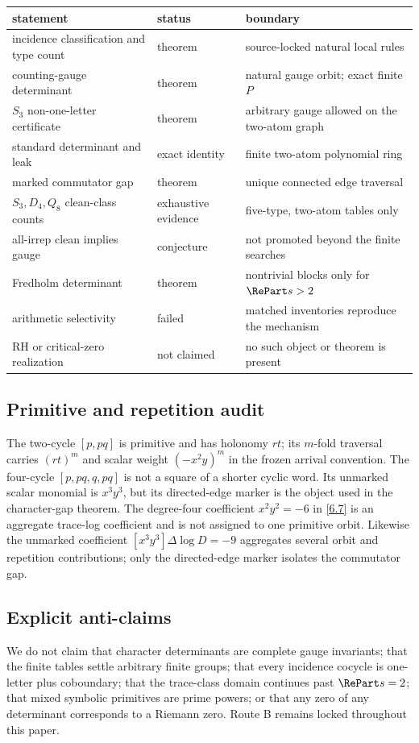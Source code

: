 \begin{tabularx}{\textwidth}{L{0.30\textwidth}L{0.18\textwidth}X}
\toprule
statement & status & boundary\\
\midrule
incidence classification and type count & theorem & source-locked natural local rules\\
counting-gauge determinant & theorem & natural gauge orbit; exact finite $P$\\
$S_3$ non-one-letter certificate & theorem & arbitrary gauge allowed on the two-atom graph\\
standard determinant and leak & exact identity & finite two-atom polynomial ring\\
marked commutator gap & theorem & unique connected edge traversal\\
$S_3,D_4,Q_8$ clean-class counts & exhaustive evidence & five-type, two-atom tables only\\
all-irrep clean implies gauge & conjecture & not promoted beyond the finite searches\\
Fredholm determinant & theorem & nontrivial blocks only for $\RePart s>2$\\
arithmetic selectivity & failed & matched inventories reproduce the mechanism\\
RH or critical-zero realization & not claimed & no such object or theorem is present\\
\bottomrule
\end{tabularx}

\subsection{Primitive and repetition audit}

The two-cycle $[p,pq]$ is primitive and has holonomy $rt$; its $m$-fold
traversal carries $(rt)^m$ and scalar weight $(-x^2y)^m$ in the frozen arrival
convention.  The four-cycle $[p,pq,q,pq]$ is not a square of a shorter cyclic
word.  Its unmarked scalar monomial is $x^3y^3$, but its directed-edge marker
is the object used in the character-gap theorem.  The degree-four coefficient
$x^2y^2=-6$ in \eqref{6.7} is an aggregate trace-log coefficient and is not
assigned to one primitive orbit.  Likewise the unmarked coefficient
$[x^3y^3]\Delta\log D=-9$ aggregates several orbit and repetition
contributions; only the directed-edge marker isolates the commutator gap.

\subsection{Explicit anti-claims}

We do not claim that character determinants are complete gauge invariants;
that the finite tables settle arbitrary finite groups; that every incidence
cocycle is one-letter plus coboundary; that the trace-class domain continues
past $\RePart s=2$; that mixed symbolic primitives are prime powers; or that
any zero of any determinant corresponds to a Riemann zero.  Route B remains
locked throughout this paper.
